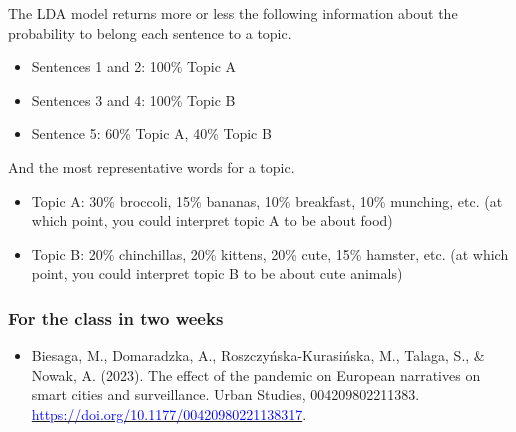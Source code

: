 \documentclass[aspectratio=169]{beamer}
\begin{document}
\begin{frame}
{        The LDA model returns more or less the following information about the probability to belong each sentence to a topic.
        
        \begin{itemize}
            \item Sentences 1 and 2: 100\% Topic A
            \item Sentences 3 and 4: 100\% Topic B
            \item Sentence 5: 60\% Topic A, 40\% Topic B
        \end{itemize}

        And the most representative words for a topic.
        
        \begin{itemize}
            \item Topic A: 30\% broccoli, 15\% bananas, 10\% breakfast, 10\% munching, etc. (at which point, you could interpret topic A to be about food)
            \item Topic B: 20\% chinchillas, 20\% kittens, 20\% cute, 15\% hamster, etc. (at which point, you could interpret topic B to be about cute animals)
        \end{itemize}

    }
\end{frame}


\begin{frame}
    \frametitle{For the class in two weeks}
    \begin{itemize}
        \item Biesaga, M., Domaradzka, A., Roszczyńska-Kurasińska, M., Talaga,
        S., \& Nowak, A. (2023). The effect of the pandemic on European
        narratives on smart cities and surveillance. Urban Studies,
        004209802211383. \href{https://doi.org/10.1177/00420980221138317}{\textcolor{blue}{https://doi.org/10.1177/00420980221138317}}.
    \end{itemize}
\end{frame}
\end{document}
